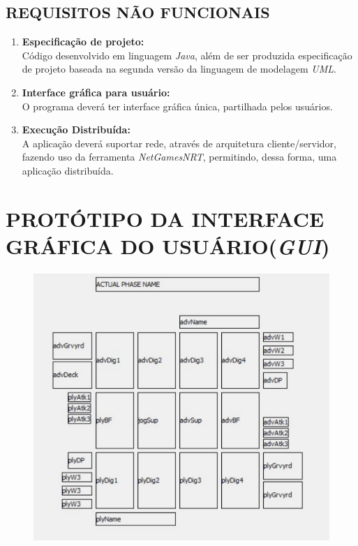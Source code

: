 \documentclass[12pt,a4paper,brazil,abntex2]{article}
\begin{document}
	\subsection{\normalsize REQUISITOS NÃO FUNCIONAIS}
		
		\begin{enumerate}

			\item {\bf Especificação de projeto:}\\Código desenvolvido em linguagem \textit{Java}, além de ser produzida especificação de projeto baseada na segunda versão da linguagem de modelagem \textit{UML}.

			\item {\bf Interface gráfica para usuário:}\\O programa deverá ter interface gráfica única, partilhada pelos usuários.
			
			\item {\bf Execução Distribuída:}\\ A aplicação deverá suportar rede, através de arquitetura cliente/servidor, fazendo uso da ferramenta \textit{NetGamesNRT}, permitindo, dessa forma, uma aplicação distribuída.
		\end{enumerate}
\newpage

\section{\normalsize PROTÓTIPO DA INTERFACE GRÁFICA DO USUÁRIO(\textit{GUI})}
	
	\begin{figure}[h]
	\includegraphics[scale=1]{Prototipo-GUI.pdf}
	\end{figure}
\end{document}
